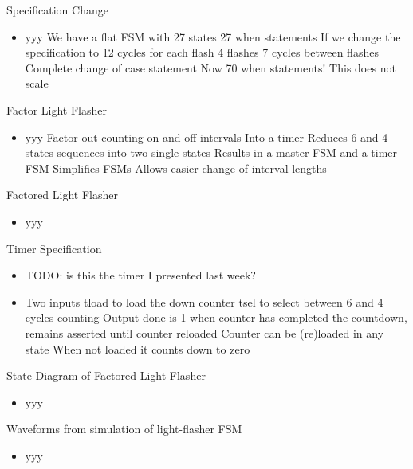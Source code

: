 \begin{frame}[fragile]{Specification Change}
\begin{itemize}
\item yyy
We have a flat FSM with 27 states
27 when statements
If we change the specification to
12 cycles for each flash
4 flashes
7 cycles between flashes
Complete change of case statement
Now 70 when statements!
This does not scale

\end{itemize}
\end{frame}

\begin{frame}[fragile]{Factor Light Flasher}
\begin{itemize}
\item yyy
Factor out counting on and off intervals
Into a timer
Reduces 6 and 4 states sequences into two single states
Results in
a master FSM and
a timer FSM
Simplifies FSMs
Allows easier change of interval lengths
\end{itemize}
\end{frame}

\begin{frame}[fragile]{Factored Light Flasher}
\begin{itemize}
\item yyy
\end{itemize}
\end{frame}

\begin{frame}[fragile]{Timer Specification}
\begin{itemize}
\item TODO: is this the timer I presented last week?
\item
Two inputs
tload to load the down counter
tsel to select between 6 and 4 cycles counting
Output
done is 1 when counter has completed the countdown, remains asserted until counter reloaded
Counter can be (re)loaded in any state
When not loaded it counts down to zero
\end{itemize}
\end{frame}

\begin{frame}[fragile]{State Diagram of Factored Light Flasher}
\begin{itemize}
\item yyy
\end{itemize}
\end{frame}

\begin{frame}[fragile]{Waveforms from simulation of light-flasher FSM}
\begin{itemize}
\item yyy
\end{itemize}
\end{frame}

